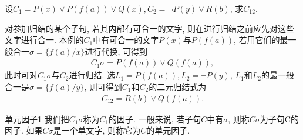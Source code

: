 \begin{example}
    设$C_1=P(x)\vee P(f(a))\vee Q(x) , C_2=\neg P(y)\vee R(b)$, 求$C_{12}$.
\end{example}
\begin{result}
对参加归结的某个子句, 若其内部有可合一的文字, 则在进行归结之前应先对这些文字进行合一.
本例的$C_1$中有可合一的文字$P(x)$与$P(f(a))$, 若用它们的最一般合一$\sigma =\{f(a)/x\}$进行代换, 可得到
\begin{align}
    C_1\sigma =P(f(a))\vee Q(f(a)),
\end{align}
此时可对$C_1\sigma$与$C_2$进行归结. 选$L_1= P(f(a)), L_2 =\neg P(y)$, $L_1$和$L_2$的最一般合一是$\sigma=\{f(a)/y\}$, 则可得到$C_1$和$C_2$的二元归结式为
\begin{align}
    C_{12}=R(b)\vee Q(f(a)).
\end{align}
\end{result}
\begin{mydef}{单元因子}{1}
    我们把$C_1\sigma$称为$C_1$的因子. 一般来说, 若子句$C$中有$\sigma$, 则称$C\sigma$为子句C的因子. 如果$C\sigma$是一个单文字, 则称它为$C$的单元因子.
\end{mydef}

